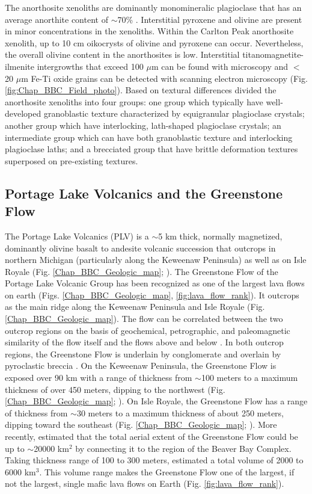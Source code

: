 The anorthosite xenoliths are dominantly monomineralic plagioclase that has an average anorthite content of $\sim$70\% \citep{Morrison1983a, Doyle2016a}. Interstitial pyroxene and olivine are present in minor concentrations in the xenoliths. Within the Carlton Peak anorthosite xenolith, up to 10 cm oikocrysts of olivine and pyroxene can occur. Nevertheless, the overall olivine content in the anorthosites is low. Interstitial titanomagnetite-ilmenite intergrowths that exceed 100 $\mu$m can be found with microscopy and $<$20 $\mu$m Fe-Ti oxide grains can be detected with scanning electron microscopy (Fig. \ref{fig:Chap_BBC_Field_photo}). Based on textural differences \cite{Morrison1983a} divided the anorthosite xenoliths into four groups: one group which typically have well-developed granoblastic texture characterized by equigranular plagioclase crystals; another group which have interlocking, lath-shaped plagioclase crystals; an intermediate group which can have both granoblastic texture and interlocking plagioclase laths; and a brecciated group that have brittle deformation textures superposed on pre-existing textures. 

\subsection{Portage Lake Volcanics and the Greenstone Flow}

The Portage Lake Volcanics (PLV) is a $\sim$5 km thick, normally magnetized, dominantly olivine basalt to andesite volcanic succession that outcrops in northern Michigan (particularly along the Keweenaw Peninsula) as well as on Isle Royale (Fig. \ref{Chap_BBC_Geologic_map}; \citealp{Huber1973a, Cannon2001a, Green1982a}). The Greenstone Flow of the Portage Lake Volcanic Group has been recognized as one of the largest lava flows on earth (Figs. \ref{Chap_BBC_Geologic_map}, \ref{fig:lava_flow_rank}). It outcrops as the main ridge along the Keweenaw Peninsula and Isle Royale (Fig. \ref{Chap_BBC_Geologic_map}). The flow can be correlated between the two outcrop regions on the basis of geochemical, petrographic, and paleomagnetic similarity of the flow itself and the flows above and below \citep{Longo1984a}. In both outcrop regions, the Greenstone Flow is underlain by conglomerate and overlain by pyroclastic breccia \citep{Lane1911a, Huber1973a}. On the Keweenaw Peninsula, the Greenstone Flow is exposed over 90 km with a range of thickness from $\sim$100 meters to a maximum thickness of over 450 meters, dipping to the northwest (Fig. \ref{Chap_BBC_Geologic_map}; \citealp{White1960a}). On Isle Royale, the Greenstone Flow has a range of thickness from $\sim$30 meters to a maximum thickness of about 250 meters, dipping toward the southeast (Fig. \ref{Chap_BBC_Geologic_map}; \citealp{Huber1973a}). More recently, \cite{Doyle2016a} estimated that the total aerial extent of the Greenstone Flow could be up to $\sim$20000 km$^2$ by connecting it to the region of the Beaver Bay Complex. Taking thickness range of 100 to 300 meters, \cite{Doyle2016a} estimated a total volume of 2000 to 6000 km$^3$. This volume range makes the Greenstone Flow one of the largest, if not the largest, single mafic lava ﬂows on Earth (Fig. \ref{fig:lava_flow_rank}).

